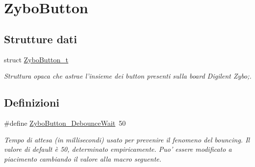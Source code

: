\hypertarget{group___zybo_button}{\section{Zybo\+Button}
\label{group___zybo_button}
}
\subsection*{Strutture dati}
\begin{DoxyCompactItemize}
\item 
struct \hyperlink{struct_zybo_button__t}{Zybo\+Button\+\_\+t}
\begin{DoxyCompactList}\small\item\em Struttura opaca che astrae l'insieme dei button presenti sulla board Digilent Zybo;. \end{DoxyCompactList}\end{DoxyCompactItemize}
\subsection*{Definizioni}
\begin{DoxyCompactItemize}
\item 
\#define \hyperlink{group___zybo_button_ga8960eefa6a431f50d4fe2a2f8063da3f}{Zybo\+Button\+\_\+\+Debounce\+Wait}~50
\begin{DoxyCompactList}\small\item\em Tempo di attesa (in millisecondi) usato per prevenire il fenomeno del bouncing. Il valore di default è 50, determinato empiricamente. Puo' essere modificato a piacimento cambiando il valore alla macro seguente. \end{DoxyCompactList}\end{DoxyCompactItemize}
